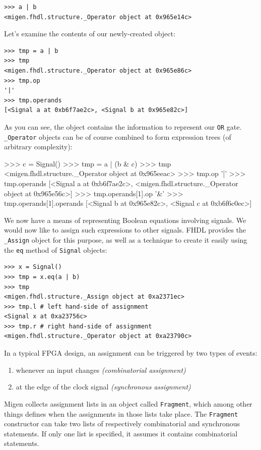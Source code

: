 \documentclass[11pt]{paper}
\begin{document}
\begin{verbatim}
>>> a | b
<migen.fhdl.structure._Operator object at 0x965e14c>
\end{verbatim}

Let's examine the contents of our newly-created object:
\begin{verbatim}
>>> tmp = a | b
>>> tmp
<migen.fhdl.structure._Operator object at 0x965e86c>
>>> tmp.op
'|'
>>> tmp.operands
[<Signal a at 0xb6f7ae2c>, <Signal b at 0x965e82c>]
\end{verbatim}

As you can see, the object contains the information to represent our \verb!OR! gate. \verb!_Operator! objects can be of course combined to form expression trees (of arbitrary complexity):
\begin{verbatimtab}
>>> c = Signal()
>>> tmp = a | (b & c)
>>> tmp
<migen.fhdl.structure._Operator object at 0x965eeac>
>>> tmp.op
'|'
>>> tmp.operands
[<Signal a at 0xb6f7ae2c>, 
  <migen.fhdl.structure._Operator object at 0x965e56c>]
>>> tmp.operands[1].op
'&'
>>> tmp.operands[1].operands
[<Signal b at 0x965e82c>, <Signal c at 0xb6f6c0ec>]
\end{verbatimtab}

We now have a means of representing Boolean equations involving signals. We would now like to assign such expressions to other signals. FHDL provides the \verb!_Assign! object for this purpose, as well as a technique to create it easily using the \verb!eq! method of \verb!Signal! objects:
\begin{verbatim}
>>> x = Signal()
>>> tmp = x.eq(a | b)
>>> tmp
<migen.fhdl.structure._Assign object at 0xa2371ec>
>>> tmp.l # left hand-side of assignment
<Signal x at 0xa23756c>
>>> tmp.r # right hand-side of assignment
<migen.fhdl.structure._Operator object at 0xa23790c>
\end{verbatim}

In a typical FPGA design, an assignment can be triggered by two types of events:
\begin{enumerate}
\item whenever an input changes \textit{(combinatorial assignment)}
\item at the edge of the clock signal \textit{(synchronous assignment)}
\end{enumerate}

Migen collects assignment lists in an object called \verb!Fragment!, which among other things defines when the assignments in those lists take place. The \verb!Fragment! constructor can take two lists of respectively combinatorial and synchronous statements. If only one list is specified, it assumes it contains combinatorial statements.
\end{document}
